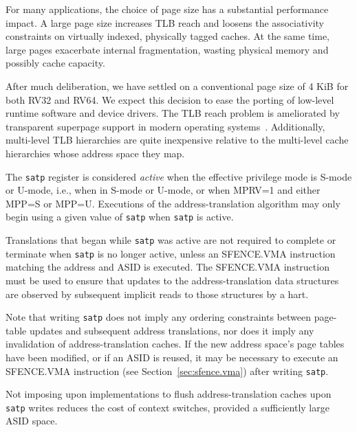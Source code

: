 \begin{commentary}
For many applications, the choice of page size has a substantial
performance impact.  A large page size increases TLB reach and loosens
the associativity constraints on virtually indexed, physically tagged
caches.  At the same time, large pages exacerbate internal
fragmentation, wasting physical memory and possibly cache capacity.

After much deliberation, we have settled on a conventional page size
of 4 KiB for both RV32 and RV64.  We expect this decision to ease the
porting of low-level runtime software and device drivers.  The TLB
reach problem is ameliorated by transparent superpage support in
modern operating systems~\cite{transparent-superpages}.  Additionally,
multi-level TLB hierarchies are quite inexpensive relative to the
multi-level cache hierarchies whose address space they map.
\end{commentary}

The {\tt satp} register is considered {\em active} when the effective
privilege mode is S-mode or U-mode, i.e., when in S-mode or U-mode,
or when MPRV=1 and either MPP=S or MPP=U.  Executions of the
address-translation algorithm may only begin using a given value of {\tt satp}
when {\tt satp} is active.

\begin{commentary}
Translations that began while {\tt satp} was active are not required to
complete or terminate when {\tt satp} is no longer active, unless an
SFENCE.VMA instruction matching the address and ASID is executed.  The
SFENCE.VMA instruction must be used to ensure that updates to the
address-translation data structures are observed by subsequent implicit reads
to those structures by a hart.
\end{commentary}

Note that writing {\tt satp} does not imply any ordering constraints
between page-table updates and subsequent address translations, nor does
it imply any invalidation of address-translation caches.
If the new address space's page tables have been modified, or if an
ASID is reused, it may be necessary to execute an SFENCE.VMA instruction
(see Section~\ref{sec:sfence.vma}) after writing {\tt satp}.

\begin{commentary}
Not imposing upon implementations to flush address-translation caches
upon {\tt satp} writes reduces the cost of context switches, provided
a sufficiently large ASID space.
\end{commentary}

